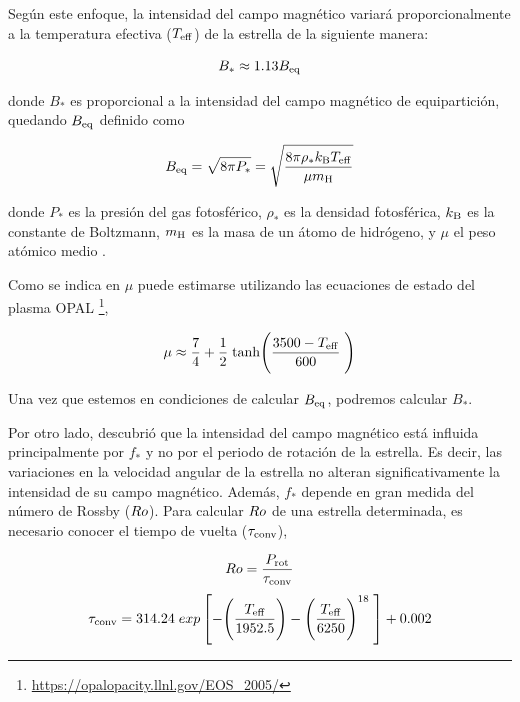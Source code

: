 Según este enfoque, la intensidad del campo magnético variará proporcionalmente a la temperatura efectiva ($T_{\mathrm{eff}}$) de la estrella de la siguiente manera: 
\begin{ceqn}
	\begin{equation}
		B_* \approx 1.13 B_{\mathrm{eq}} \label{eq:mf_bstar}
	\end{equation}
\end{ceqn}

donde $B_*$ es proporcional a la intensidad del campo magnético de equipartición, quedando $B_{\mathrm{eq}}$ definido como 

\begin{ceqn}
	\begin{equation}
		B_{\mathrm{eq}} = \sqrt{8\pi P_*} = \sqrt{\frac{8\pi\rho_* k_{\mathrm{B}} T_{\mathrm{eff}}}{\mu m_{\mathrm{H}}}}\label{eq:mf_beq}    
	\end{equation}
\end{ceqn}

donde $P_*$ es la presión del gas fotosférico, $\rho_*$ es la densidad fotosférica, $k_{\mathrm{B}}$ es la constante de Boltzmann, $m_{\mathrm{H}}$ es la masa de un átomo de hidrógeno, y $\mu$ el peso atómico medio \cite{Cranmer2011}. \par

Como se indica en \cite{Cranmer2011} $\mu$ puede estimarse utilizando las ecuaciones de estado del plasma OPAL \footnote{\url{https://opalopacity.llnl.gov/EOS_2005/}},

\begin{ceqn}
	\begin{equation}
		\mu \approx \frac{7}{4} + \frac{1}{2} \; \textrm{tanh}\Bigg(\frac{3500-T_{\mathrm{eff}}}{600}\;\Bigg) \label{eq:mf_atom_weight}
	\end{equation}
\end{ceqn}

Una vez que estemos en condiciones de calcular $B_{\mathrm{eq}}$, podremos calcular $B_*$.\par

Por otro lado, \cite{Cranmer2011} descubrió que la intensidad del campo magnético está influida principalmente por $f_*$ y no por el periodo de rotación de la estrella. Es decir, las variaciones en la velocidad angular de la estrella no alteran significativamente la intensidad de su campo magnético. Además, $f_*$ depende en gran medida del número de Rossby ($Ro$). Para calcular $Ro$ de una estrella determinada, es necesario conocer el tiempo de vuelta ($\tau_{\mathrm{conv}}$),

\begin{ceqn}
	\begin{equation}
		Ro = \frac{P_{\mathrm{rot}}}{\tau_{\mathrm{conv}}} \label{eq:mf_rossby}
	\end{equation}
	\begin{equation}
		\tau_{\mathrm{conv}} = 314.24\;exp\left[-\Bigg(\frac{T_{\mathrm{eff}}}{1952.5}\Bigg)-\Bigg(\frac{T_{\mathrm{eff}}}{6250}\Bigg)^{18} \;\right]+0.002 \label{eq:mf_turnover}
	\end{equation}
\end{ceqn}

